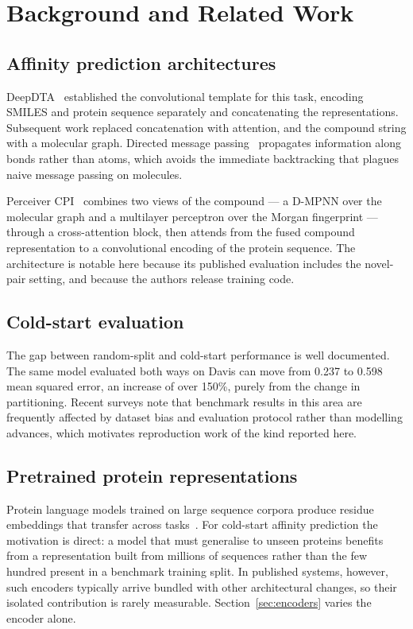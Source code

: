 \documentclass[conference]{IEEEtran}
\begin{document}
\section{Background and Related Work}

\subsection{Affinity prediction architectures}

DeepDTA~\cite{ozturk2018} established the convolutional template for this task, encoding SMILES and
protein sequence separately and concatenating the representations. Subsequent work replaced
concatenation with attention, and the compound string with a molecular graph. Directed message
passing~\cite{yang2019} propagates information along bonds rather than atoms, which avoids the
immediate backtracking that plagues naive message passing on molecules.

Perceiver CPI~\cite{nguyen2023} combines two views of the compound --- a D-MPNN over the molecular
graph and a multilayer perceptron over the Morgan fingerprint --- through a cross-attention block,
then attends from the fused compound representation to a convolutional encoding of the protein
sequence. The architecture is notable here because its published evaluation includes the novel-pair
setting, and because the authors release training code.

\subsection{Cold-start evaluation}

The gap between random-split and cold-start performance is well documented. The same model
evaluated both ways on Davis can move from 0.237 to 0.598 mean squared error, an increase of over
150\%, purely from the change in partitioning. Recent surveys note that benchmark results in this
area are frequently affected by dataset bias and evaluation protocol rather than modelling
advances, which motivates reproduction work of the kind reported here.

\subsection{Pretrained protein representations}

Protein language models trained on large sequence corpora produce residue embeddings that transfer
across tasks~\cite{lin2023}. For cold-start affinity prediction the motivation is direct: a model
that must generalise to unseen proteins benefits from a representation built from millions of
sequences rather than the few hundred present in a benchmark training split. In published systems,
however, such encoders typically arrive bundled with other architectural changes, so their isolated
contribution is rarely measurable. Section~\ref{sec:encoders} varies the encoder alone.
\end{document}
